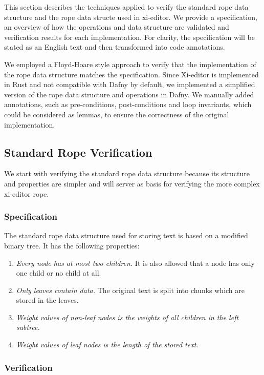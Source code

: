 This section describes the techniques applied to verify the standard rope data structure and the rope data structe used in xi-editor.
We provide a specification, an overview of how the operations and data structure are validated and verification results for each implementation.
For clarity, the specification will be stated as an English text and then transformed into code annotations.

We employed a Floyd-Hoare style approach to verify that the implementation of the rope data structure matches the specification.
Since Xi-editor is implemented in Rust and not compatible with Dafny by default, we implemented a simplified version of the rope data structure and operations in Dafny.
We manually added annotations, such as pre-conditions, post-conditions and loop invariants, which could be considered as lemmas, to ensure the correctness of the original implementation.


\subsection{Standard Rope Verification}

We start with verifying the standard rope data structure because its structure and properties are simpler and will server as basis for verifying the more complex xi-editor rope.

\subsubsection{Specification}

The standard rope data structure used for storing text is based on a modified binary tree. 
It has the following properties:

\begin{enumerate}
  \item \textit{Every node has at most two children.} It is also allowed that a node has only one child or no child at all.
  \item \textit{Only leaves contain data.} The original text is split into chunks which are stored in the leaves.
  \item \textit{Weight values of non-leaf nodes is the weights of all children in the left subtree.}
  \item \textit{Weight values of leaf nodes is the length of the stored text.}
\end{enumerate}

\subsubsection{Verification}


